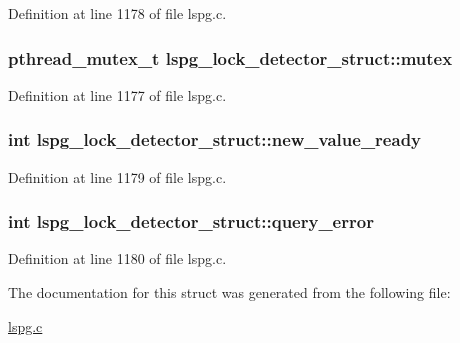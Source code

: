 Definition at line 1178 of file lspg.\-c.

\hypertarget{structlspg__lock__detector__struct_ab5ab5534b376a8fbafdd0b54cec4483c}{
\subsubsection[{mutex}]{\setlength{\rightskip}{0pt plus 5cm}pthread\-\_\-mutex\-\_\-t lspg\-\_\-lock\-\_\-detector\-\_\-struct\-::mutex}}\label{structlspg__lock__detector__struct_ab5ab5534b376a8fbafdd0b54cec4483c}


Definition at line 1177 of file lspg.\-c.

\hypertarget{structlspg__lock__detector__struct_a62373414b815fe178edd8522b3bd4d78}{
\subsubsection[{new\-\_\-value\-\_\-ready}]{\setlength{\rightskip}{0pt plus 5cm}int lspg\-\_\-lock\-\_\-detector\-\_\-struct\-::new\-\_\-value\-\_\-ready}}\label{structlspg__lock__detector__struct_a62373414b815fe178edd8522b3bd4d78}


Definition at line 1179 of file lspg.\-c.

\hypertarget{structlspg__lock__detector__struct_afdad2787564475cac316153d117c3748}{
\subsubsection[{query\-\_\-error}]{\setlength{\rightskip}{0pt plus 5cm}int lspg\-\_\-lock\-\_\-detector\-\_\-struct\-::query\-\_\-error}}\label{structlspg__lock__detector__struct_afdad2787564475cac316153d117c3748}


Definition at line 1180 of file lspg.\-c.



The documentation for this struct was generated from the following file\-:\begin{DoxyCompactItemize}
\item 
\hyperlink{lspg_8c}{lspg.\-c}\end{DoxyCompactItemize}
